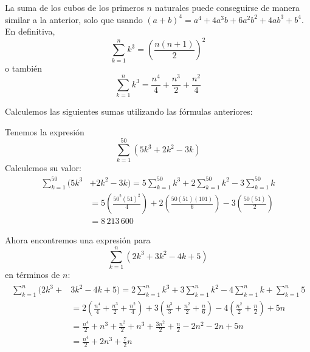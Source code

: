 \begin{ejemplo}\label{SumaCubos}
  La suma de los cubos de los primeros $n$ naturales puede conseguirse de manera similar a la anterior, solo que usando $(a+b)^4=a^4+4a^3b+6a^2b^2+4ab^3+b^4$. En definitiva,
  \[
    \sum_{k=1}^{n}k^{3}=\left(\frac{n(n+1)}{2}\right)^2
  \]
  o también
  \[
    \sum_{k=1}^{n}k^{3}=\frac{n^4}{4}+\frac{n^3}{2}+\frac{n^2}{4}
  \]

\end{ejemplo}

\begin{ejemplo}
  Calculemos las siguientes sumas utilizando las fórmulas anteriores:
\end{ejemplo}
\begin{parrafonumerado}

\item Tenemos la expresión
  \[
    \sum_{k=1}^{50}\left( 5k^{3}+2k^{2}-3k\right)
  \]
  Calculemos su valor:
  \begin{align*}
    \sum_{k=1}^{50}(5k^{3}&+2k^{2}-3k)=5\sum_{k=1}^{50}k^{3}+2\sum_{k=1}^{50}k^{2}-3\sum_{k=1}^{50}k\\
    &=5\left( \frac{50^{2}\left( 51\right) ^{2}}{4}\right) +2\left( \frac{
    50\left( 51\right) \left( 101\right) }{6}\right) -3\left( \frac{50\left(
    51\right) }{2}\right) \\
    &=8\,213\,600
  \end{align*}

\item Ahora encontremos una expresión para
  \[
    \sum_{k=1}^{n}\left(2k^{3}+3k^{2}-4k+5\right)
  \]
  en términos de $n$:
  \begin{gather*}
    \begin{aligned}
      \sum_{k=1}^{n}( 2k^{3}+&3k^{2}-4k+5)
      =2\sum_{k=1}^{n}k^{3}+3\sum_{k=1}^{n}k^{2}-4\sum_{k=1}^{n}k+\sum_{k=1}^{n}5\\
      &=2\left( \frac{n^{4}}{4}+\frac{n^{3}}{2}+\frac{n^{2}}{4}\right) +3\left(
      \frac{n^{3}}{3}+\frac{n^{2}}{2}+\frac{n}{6}\right)%
      -4\left( \frac{n^{2}}{2}+\frac{n}{2}\right) +5n\\
      &=\frac{n^{4}}{2}+n^{3}+\frac{n^{2}}{2}+n^{3}+\frac{3n^{2}}{2}+\frac{n}{2} -2n^{2}-2n+5n\\
      &=\frac{n^{4}}{2}+2n^{3}+\frac{7}{2}n
    \end{aligned}
  \end{gather*}
\end{parrafonumerado}

